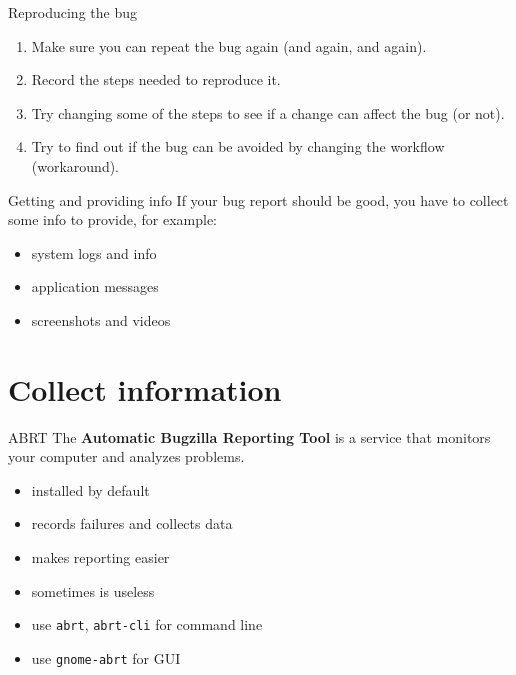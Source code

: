 \documentclass[12pt]{beamer}
\begin{document}
\begin{frame}{Reproducing the bug}
	\begin{enumerate}
		\item Make sure you can repeat the bug again (and again, and again).
		\item Record the steps needed to reproduce it.
		\item Try changing some of the steps to see if a change can affect the bug (or not).
		\item Try to find out if the bug can be avoided by changing the workflow (workaround).
	\end{enumerate}
\end{frame}

\begin{frame}{Getting and providing info}
If your bug report should be good, you have to collect some info to provide, for example:
\begin{itemize}
	\item system logs and info
	\item application messages
	\item screenshots and videos
\end{itemize}
\end{frame}

\section{Collect information}
\begin{frame}{ABRT}
The \textbf{Automatic Bugzilla Reporting Tool} is a service that monitors your computer and analyzes problems.
\begin{itemize}
	\item installed by default
	\item records failures and collects data
	\item makes reporting easier
	\item sometimes is useless
	\item use {\color{blue}\texttt{abrt}}, {\color{blue} \texttt{abrt-cli}} for command line
	\item use {\color{blue} \texttt{gnome-abrt}} for GUI 
\end{itemize}
\end{frame}
\end{document}
